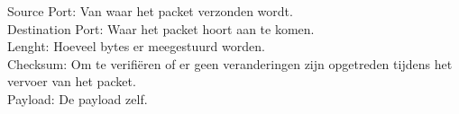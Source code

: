 Source Port: Van waar het packet verzonden wordt.\\

Destination Port: Waar het packet hoort aan te komen.\\

Lenght: Hoeveel bytes er meegestuurd worden. \\

Checksum: Om te verifiëren of er geen veranderingen zijn opgetreden tijdens het vervoer van het packet. \\

Payload: De payload zelf.